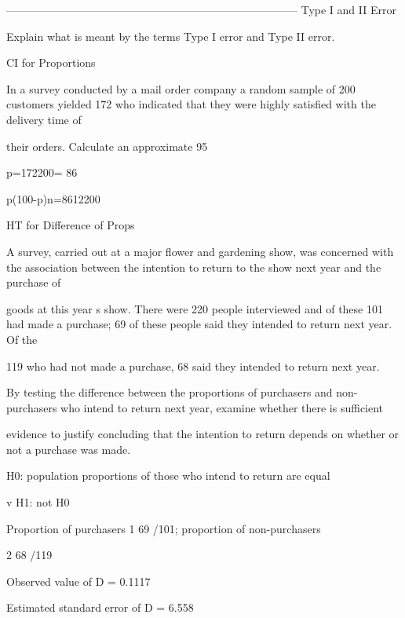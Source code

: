 


--------------------------------------------------------------------------------
Type I and II Error

Explain what is meant by the terms Type I error and Type II error.

CI for Proportions

In a survey conducted by a mail order company a random sample of 200 customers yielded 172 who indicated that they were highly satisfied with the delivery time of

their orders. Calculate an approximate 95%



p=172200= 86%


p(100-p)n=8612200




HT for Difference of Props


A survey, carried out at a major flower and gardening show, was concerned with the association between the intention to return to the show next year and the purchase of

goods at this year s show. There were 220 people interviewed and of these 101 had made a purchase; 69 of these people said they intended to return next year. Of the

119 who had not made a purchase, 68 said they intended to return next year.


By testing the difference between the proportions of purchasers and non-purchasers who intend to return next year, examine whether there is sufficient

evidence to justify concluding that the intention to return depends on whether or not a purchase was made.



H0: population proportions of those who intend to return are equal

v H1: not H0

Proportion of purchasers 1 69 /101; proportion of non-purchasers

2 68 /119



Observed value of D = 0.1117


Estimated standard error of D = 6.558%

